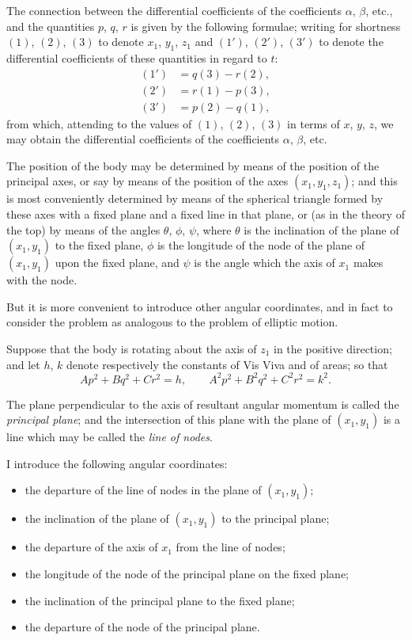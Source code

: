 \documentclass[11pt,a4paper]{book}
\begin{document}
The connection between the differential coefficients of the coefficients $\alpha$, $\beta$, etc., and the quantities $p$, $q$, $r$ is given by the following formulae; writing for shortness $(1)$, $(2)$, $(3)$ to denote $x_1$, $y_1$, $z_1$ and $(1')$, $(2')$, $(3')$ to denote the differential coefficients of these quantities in regard to $t$:
\begin{align*}
(1') &= q(3) - r(2), \\
(2') &= r(1) - p(3), \\
(3') &= p(2) - q(1),
\end{align*}
from which, attending to the values of $(1)$, $(2)$, $(3)$ in terms of $x$, $y$, $z$, we may obtain the differential coefficients of the coefficients $\alpha$, $\beta$, etc.

The position of the body may be determined by means of the position of the principal axes, or say by means of the position of the axes $(x_1, y_1, z_1)$; and this is most conveniently determined by means of the spherical triangle formed by these axes with a fixed plane and a fixed line in that plane, or (as in the theory of the top) by means of the angles $\theta$, $\phi$, $\psi$, where $\theta$ is the inclination of the plane of $(x_1, y_1)$ to the fixed plane, $\phi$ is the longitude of the node of the plane of $(x_1, y_1)$ upon the fixed plane, and $\psi$ is the angle which the axis of $x_1$ makes with the node.

But it is more convenient to introduce other angular coordinates, and in fact to consider the problem as analogous to the problem of elliptic motion.

Suppose that the body is rotating about the axis of $z_1$ in the positive direction; and let $h$, $k$ denote respectively the constants of Vis Viva and of areas; so that
\[
Ap^2 + Bq^2 + Cr^2 = h, \qquad A^2p^2 + B^2q^2 + C^2r^2 = k^2.
\]

The plane perpendicular to the axis of resultant angular momentum is called the \textit{principal plane}; and the intersection of this plane with the plane of $(x_1, y_1)$ is a line which may be called the \textit{line of nodes}.

I introduce the following angular coordinates:
\begin{itemize}
\item[$T$,] the departure of the line of nodes in the plane of $(x_1, y_1)$;
\item[$S$,] the inclination of the plane of $(x_1, y_1)$ to the principal plane;
\item[$F$,] the departure of the axis of $x_1$ from the line of nodes;
\item[$\theta$,] the longitude of the node of the principal plane on the fixed plane;
\item[$\phi$,] the inclination of the principal plane to the fixed plane;
\item[$\sigma$,] the departure of the node of the principal plane.
\end{itemize}
\end{document}
